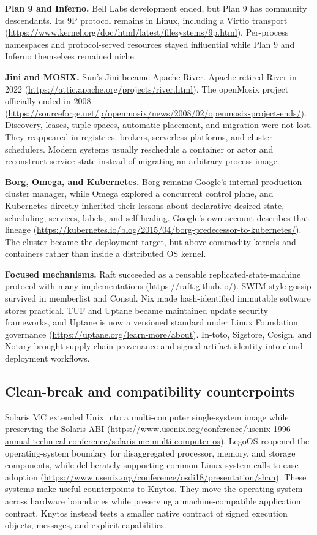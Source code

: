 \textbf{Plan 9 and Inferno.} Bell Labs development ended, but Plan 9 has
community descendants. Its 9P protocol remains in Linux, including a Virtio
transport (\url{https://www.kernel.org/doc/html/latest/filesystems/9p.html}).
Per-process namespaces and protocol-served resources stayed influential while
Plan 9 and Inferno themselves remained niche.

\textbf{Jini and MOSIX.} Sun's Jini became Apache River. Apache retired River
in 2022 (\url{https://attic.apache.org/projects/river.html}). The openMosix
project officially ended in 2008
(\url{https://sourceforge.net/p/openmosix/news/2008/02/openmosix-project-ends/}).
Discovery, leases, tuple spaces, automatic placement, and migration were not
lost. They reappeared in registries, brokers, serverless platforms, and
cluster schedulers. Modern systems usually reschedule a container or actor and
reconstruct service state instead of migrating an arbitrary process image.

\textbf{Borg, Omega, and Kubernetes.} Borg remains Google's internal
production cluster manager, while Omega explored a concurrent control plane, and
Kubernetes directly inherited their lessons about declarative desired state,
scheduling, services, labels, and self-healing. Google's own account describes
that lineage (\url{https://kubernetes.io/blog/2015/04/borg-predecessor-to-kubernetes/}).
The cluster became the deployment target, but above commodity kernels and
containers rather than inside a distributed OS kernel.

\textbf{Focused mechanisms.} Raft succeeded as a reusable 
replicated-state-machine protocol with many implementations (\url{https://raft.github.io/}).
SWIM-style gossip survived in memberlist and Consul. Nix made hash-identified
immutable software stores practical. TUF and Uptane became maintained update
security frameworks, and Uptane is now a versioned standard under Linux Foundation
governance (\url{https://uptane.org/learn-more/about}). In-toto, Sigstore,
Cosign, and Notary brought supply-chain provenance and signed artifact identity
into cloud deployment workflows.

\subsection{Clean-break and compatibility counterpoints}

Solaris MC extended Unix into a multi-computer single-system image while
preserving the Solaris ABI
(\url{https://www.usenix.org/conference/usenix-1996-annual-technical-conference/solaris-mc-multi-computer-os}).
LegoOS reopened the operating-system boundary for disaggregated processor,
memory, and storage components, while deliberately supporting common Linux
system calls to ease adoption
(\url{https://www.usenix.org/conference/osdi18/presentation/shan}). These
systems make useful counterpoints to Knytos. They move the operating
system across hardware boundaries while preserving a machine-compatible
application contract. Knytos instead tests a smaller native contract of
signed execution objects, messages, and explicit capabilities.

